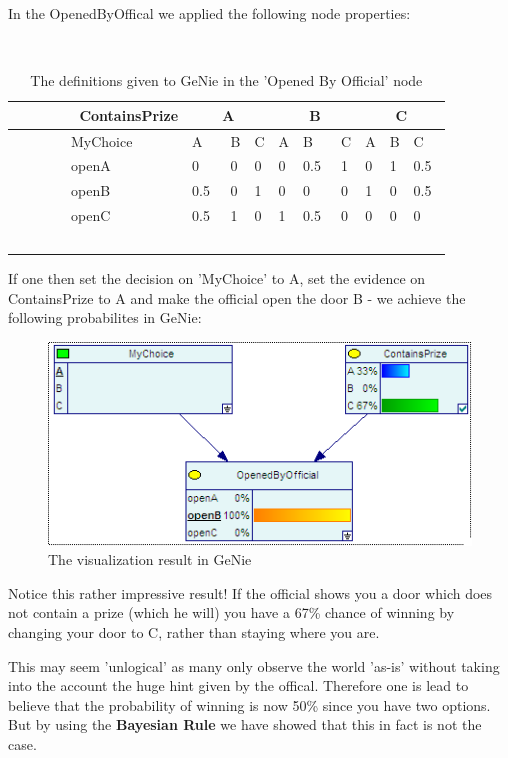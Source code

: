 \documentclass{article}
\begin{document}
In the OpenedByOffical we applied the following node properties:

\begin{table}[h]
    \begin{tabular}{|l|l|l|l|l|l|l|l|l|l|} 
    \hline
        ContainsPrize & \multicolumn{3}{|c|}{A} & \multicolumn{3}{|c|}{B} & \multicolumn{3}{|c|}{C} \\ \hline
        MyChoice      & A   & B & C & A & B   & C & A & B & C   \\ \hline
        openA         & 0   & 0 & 0 & 0 & 0.5 & 1 & 0 & 1 & 0.5 \\
        openB         & 0.5 & 0 & 1 & 0 & 0   & 0 & 1 & 0 & 0.5 \\
        openC         & 0.5 & 1 & 0 & 1 & 0.5 & 0 & 0 & 0 & 0   \\
    \hline
    \end{tabular}
    \caption{The definitions given to GeNie in the 'Opened By Official' node}
\end{table}

\newpage
If one then set the decision on 'MyChoice' to A, set the evidence on ContainsPrize to A and make the official open the door B - we achieve the following probabilites in GeNie:

\begin{figure}[h]
\centering
\includegraphics[scale=0.75]{genieresult.png}
\caption{The visualization result in GeNie}
\end{figure}

Notice this rather impressive result! If the official shows you a door which does not contain a prize (which he will) you have a 67\% chance of winning by changing your door to C, rather than staying where you are.

This may seem 'unlogical' as many only observe the world 'as-is' without taking into the account the huge hint given by the offical.
Therefore one is lead to believe that the probability of winning is now 50\% since you have two options. But by using the
{\bf Bayesian Rule} we have showed that this in fact is not the case.
\end{document}
